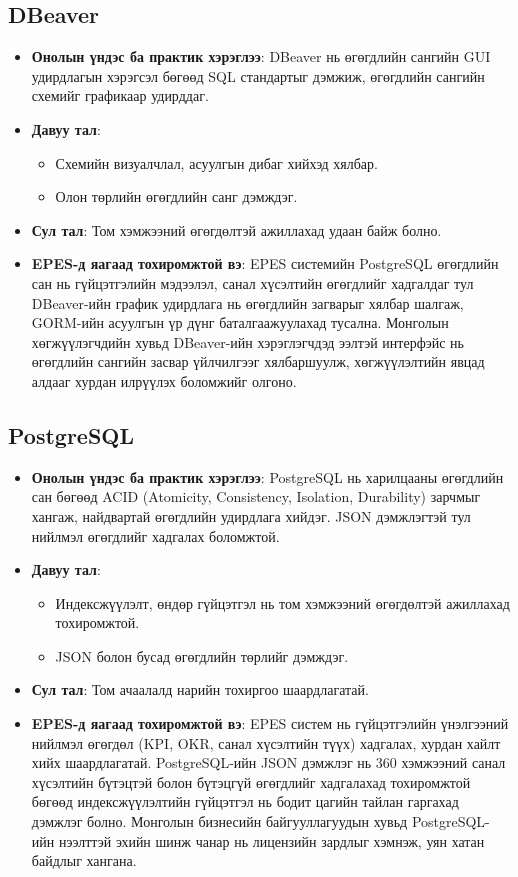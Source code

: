 \subsection{DBeaver}
\begin{itemize}
    \item \textbf{Онолын үндэс ба практик хэрэглээ}: DBeaver нь өгөгдлийн сангийн GUI удирдлагын хэрэгсэл бөгөөд SQL стандартыг дэмжиж, өгөгдлийн сангийн схемийг 
    графикаар удирддаг.
    \item \textbf{Давуу тал}:
    \begin{itemize}
        \item Схемийн визуалчлал, асуулгын дибаг хийхэд хялбар.
        \item Олон төрлийн өгөгдлийн санг дэмждэг.
    \end{itemize}
    \item \textbf{Сул тал}: Том хэмжээний өгөгдөлтэй ажиллахад удаан байж болно.
    \item \textbf{EPES-д яагаад тохиромжтой вэ}: EPES системийн PostgreSQL өгөгдлийн сан нь гүйцэтгэлийн мэдээлэл, санал хүсэлтийн өгөгдлийг хадгалдаг тул 
    DBeaver-ийн график удирдлага нь өгөгдлийн загварыг хялбар шалгаж, GORM-ийн асуулгын үр дүнг баталгаажуулахад тусална. Монголын хөгжүүлэгчдийн хувьд 
    DBeaver-ийн хэрэглэгчдэд ээлтэй интерфэйс нь өгөгдлийн сангийн засвар үйлчилгээг хялбаршуулж, хөгжүүлэлтийн явцад алдааг хурдан илрүүлэх боломжийг олгоно.
\end{itemize}

\subsection{PostgreSQL}
\begin{itemize}
    \item \textbf{Онолын үндэс ба практик хэрэглээ}: PostgreSQL нь харилцааны өгөгдлийн сан бөгөөд ACID (Atomicity, Consistency, Isolation, Durability) зарчмыг 
    хангаж, найдвартай өгөгдлийн удирдлага хийдэг. JSON дэмжлэгтэй тул нийлмэл өгөгдлийг хадгалах боломжтой.
    \item \textbf{Давуу тал}:
    \begin{itemize}
        \item Индексжүүлэлт, өндөр гүйцэтгэл нь том хэмжээний өгөгдөлтэй ажиллахад тохиромжтой.
        \item JSON болон бусад өгөгдлийн төрлийг дэмждэг.
    \end{itemize}
    \item \textbf{Сул тал}: Том ачаалалд нарийн тохиргоо шаардлагатай.
    \item \textbf{EPES-д яагаад тохиромжтой вэ}: EPES систем нь гүйцэтгэлийн үнэлгээний нийлмэл өгөгдөл (KPI, OKR, санал хүсэлтийн түүх) хадгалах, хурдан хайлт 
    хийх шаардлагатай. PostgreSQL-ийн JSON дэмжлэг нь 360 хэмжээний санал хүсэлтийн бүтэцтэй болон бүтэцгүй өгөгдлийг хадгалахад тохиромжтой бөгөөд индексжүүлэлтийн 
    гүйцэтгэл нь бодит цагийн тайлан гаргахад дэмжлэг болно. Монголын бизнесийн байгууллагуудын хувьд PostgreSQL-ийн нээлттэй эхийн шинж чанар нь лицензийн зардлыг 
    хэмнэж, уян хатан байдлыг хангана.
\end{itemize}

